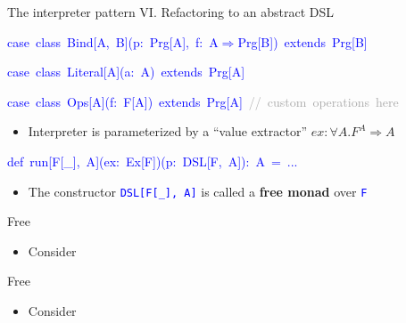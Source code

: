 \documentclass[english,,russian]{beamer}
\newenvironment{lyxcode}
  {\par\begin{list}{}{
    \setlength{\rightmargin}{\leftmargin}
    \setlength{\listparindent}{0pt}%
    \raggedright
    \setlength{\itemsep}{0pt}
    \setlength{\parsep}{0pt}
    \normalfont\ttfamily}%
   \def\{{\char`\{}
   \def\}{\char`\}}
   \def\textasciitilde{\char`\~}
   \item[]}
  {\end{list}}
\begin{document}
\begin{frame}{The interpreter pattern VI. Refactoring to an abstract DSL}
\begin{lyxcode}
\textcolor{blue}{\footnotesize{}case~class~Bind{[}A,~B{]}(p:~Prg{[}A{]},~f:~A$\Rightarrow$Prg{[}B{]})~extends~Prg{[}B{]}}{\footnotesize\par}

\textcolor{blue}{\footnotesize{}case~class~Literal{[}A{]}(a:~A)~extends~Prg{[}A{]}}{\footnotesize\par}

\textcolor{blue}{\footnotesize{}case~class~Ops{[}A{]}(f:~F{[}A{]})~extends~Prg{[}A{]}}\textcolor{darkgray}{\footnotesize{}~//~custom~operations~here}{\footnotesize\par}
\end{lyxcode}
\begin{itemize}
\item Interpreter is parameterized by a ``value extractor'' $ex:\forall A.F^{A}\Rightarrow A$
\end{itemize}
\begin{lyxcode}
\textcolor{blue}{\footnotesize{}def~run{[}F{[}\_{]},~A{]}(ex:~Ex{[}F{]})(p:~DSL{[}F,~A{]}):~A~=~...}{\footnotesize\par}
\end{lyxcode}
\begin{itemize}
\item The constructor \texttt{\textcolor{blue}{\footnotesize{}DSL{[}F{[}\_{]},
A{]}}} is called a \textbf{free monad} over \texttt{\textcolor{blue}{\footnotesize{}F}} 
\end{itemize}
\end{frame}

\begin{frame}{Free}
\begin{itemize}
\item Consider 
\end{itemize}
\end{frame}

\begin{frame}{Free}
\begin{itemize}
\item Consider 
\end{itemize}
\end{frame}
\end{document}
